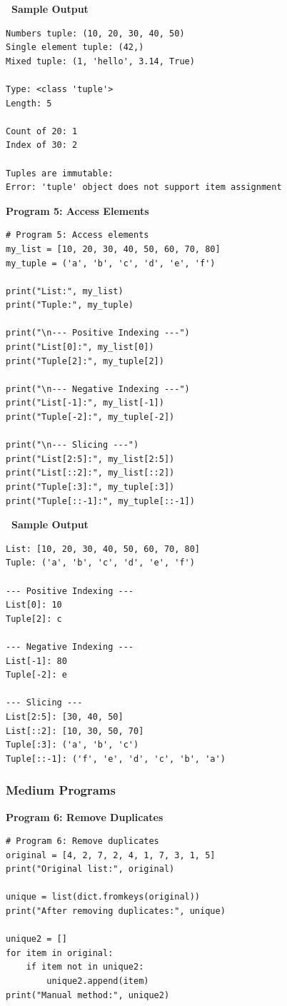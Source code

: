 \documentclass[12pt,a4paper]{article}
\newcommand{\outhead}{\noindent\colorbox{cmrgreen!25}%
  {\textbf{\small\color{cmrdark}~Sample Output~}}\par\vspace{-1pt}}
\begin{document}
\outhead
\begin{lstlisting}[style=outputstyle]
Numbers tuple: (10, 20, 30, 40, 50)
Single element tuple: (42,)
Mixed tuple: (1, 'hello', 3.14, True)

Type: <class 'tuple'>
Length: 5

Count of 20: 1
Index of 30: 2

Tuples are immutable:
Error: 'tuple' object does not support item assignment
\end{lstlisting}

\vspace{0.5cm}

\textbf{Program 5: Access Elements}

\begin{lstlisting}
# Program 5: Access elements
my_list = [10, 20, 30, 40, 50, 60, 70, 80]
my_tuple = ('a', 'b', 'c', 'd', 'e', 'f')

print("List:", my_list)
print("Tuple:", my_tuple)

print("\n--- Positive Indexing ---")
print("List[0]:", my_list[0])
print("Tuple[2]:", my_tuple[2])

print("\n--- Negative Indexing ---")
print("List[-1]:", my_list[-1])
print("Tuple[-2]:", my_tuple[-2])

print("\n--- Slicing ---")
print("List[2:5]:", my_list[2:5])
print("List[::2]:", my_list[::2])
print("Tuple[:3]:", my_tuple[:3])
print("Tuple[::-1]:", my_tuple[::-1])
\end{lstlisting}

\outhead
\begin{lstlisting}[style=outputstyle]
List: [10, 20, 30, 40, 50, 60, 70, 80]
Tuple: ('a', 'b', 'c', 'd', 'e', 'f')

--- Positive Indexing ---
List[0]: 10
Tuple[2]: c

--- Negative Indexing ---
List[-1]: 80
Tuple[-2]: e

--- Slicing ---
List[2:5]: [30, 40, 50]
List[::2]: [10, 30, 50, 70]
Tuple[:3]: ('a', 'b', 'c')
Tuple[::-1]: ('f', 'e', 'd', 'c', 'b', 'a')
\end{lstlisting}

\subsubsection{Medium Programs}

\textbf{Program 6: Remove Duplicates}

\begin{lstlisting}
# Program 6: Remove duplicates
original = [4, 2, 7, 2, 4, 1, 7, 3, 1, 5]
print("Original list:", original)

unique = list(dict.fromkeys(original))
print("After removing duplicates:", unique)

unique2 = []
for item in original:
    if item not in unique2:
        unique2.append(item)
print("Manual method:", unique2)
\end{lstlisting}
\end{document}

